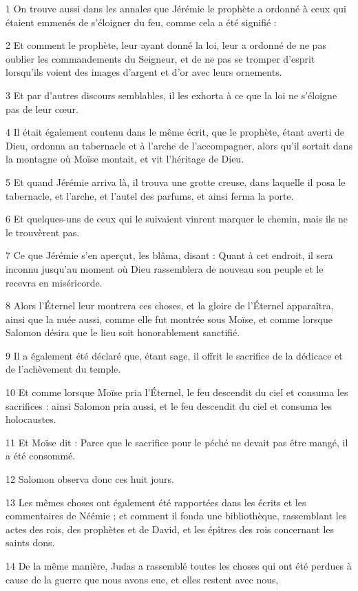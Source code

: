 \par 1 On trouve aussi dans les annales que Jérémie le prophète a ordonné à ceux qui étaient emmenés de s'éloigner du feu, comme cela a été signifié :
\par 2 Et comment le prophète, leur ayant donné la loi, leur a ordonné de ne pas oublier les commandements du Seigneur, et de ne pas se tromper d'esprit lorsqu'ils voient des images d'argent et d'or avec leurs ornements.
\par 3 Et par d'autres discours semblables, il les exhorta à ce que la loi ne s'éloigne pas de leur cœur.
\par 4 Il était également contenu dans le même écrit, que le prophète, étant averti de Dieu, ordonna au tabernacle et à l'arche de l'accompagner, alors qu'il sortait dans la montagne où Moïse montait, et vit l'héritage de Dieu.
\par 5 Et quand Jérémie arriva là, il trouva une grotte creuse, dans laquelle il posa le tabernacle, et l'arche, et l'autel des parfums, et ainsi ferma la porte.
\par 6 Et quelques-uns de ceux qui le suivaient vinrent marquer le chemin, mais ils ne le trouvèrent pas.
\par 7 Ce que Jérémie s'en aperçut, les blâma, disant : Quant à cet endroit, il sera inconnu jusqu'au moment où Dieu rassemblera de nouveau son peuple et le recevra en miséricorde.
\par 8 Alors l'Éternel leur montrera ces choses, et la gloire de l'Éternel apparaîtra, ainsi que la nuée aussi, comme elle fut montrée sous Moïse, et comme lorsque Salomon désira que le lieu soit honorablement sanctifié.
\par 9 Il a également été déclaré que, étant sage, il offrit le sacrifice de la dédicace et de l'achèvement du temple.
\par 10 Et comme lorsque Moïse pria l'Éternel, le feu descendit du ciel et consuma les sacrifices : ainsi Salomon pria aussi, et le feu descendit du ciel et consuma les holocaustes.
\par 11 Et Moïse dit : Parce que le sacrifice pour le péché ne devait pas être mangé, il a été consommé.
\par 12 Salomon observa donc ces huit jours.
\par 13 Les mêmes choses ont également été rapportées dans les écrits et les commentaires de Néémie ; et comment il fonda une bibliothèque, rassemblant les actes des rois, des prophètes et de David, et les épîtres des rois concernant les saints dons.
\par 14 De la même manière, Judas a rassemblé toutes les choses qui ont été perdues à cause de la guerre que nous avons eue, et elles restent avec nous,
